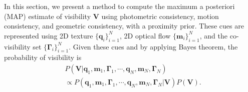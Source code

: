 In this section, we present a method to compute the maximum a posteriori (MAP) estimate of visibility $\mathbf{V}$ using photometric consistency, motion consistency, and geometric consistency, with a proximity prior. These cues are represented using 2D texture $\{ \mathbf{q}_i \}_{i=1}^N$, 2D optical flow $\{ \mathbf{m}_i \}_{i=1}^N$, and the co-visibility set $\{ \bm{\Gamma}_i \}_{i=1}^N$. Given these cues and by applying Bayes theorem, the probability of visibility is
\begin{align}
&P( \mathbf{V} | \mathbf{q}_1, \mathbf{m}_1, \bm{\Gamma}_1, \cdots, \mathbf{q}_N,  \mathbf{m}_N, \bm{\Gamma}_N ) \nonumber\\
&\propto P(\mathbf{q}_1, \mathbf{m}_1, \bm{\Gamma}_1, \cdots, \mathbf{q}_N,  \mathbf{m}_N, \bm{\Gamma}_N |  \mathbf{V}) P(\mathbf{V}).  \nonumber
\end{align}


